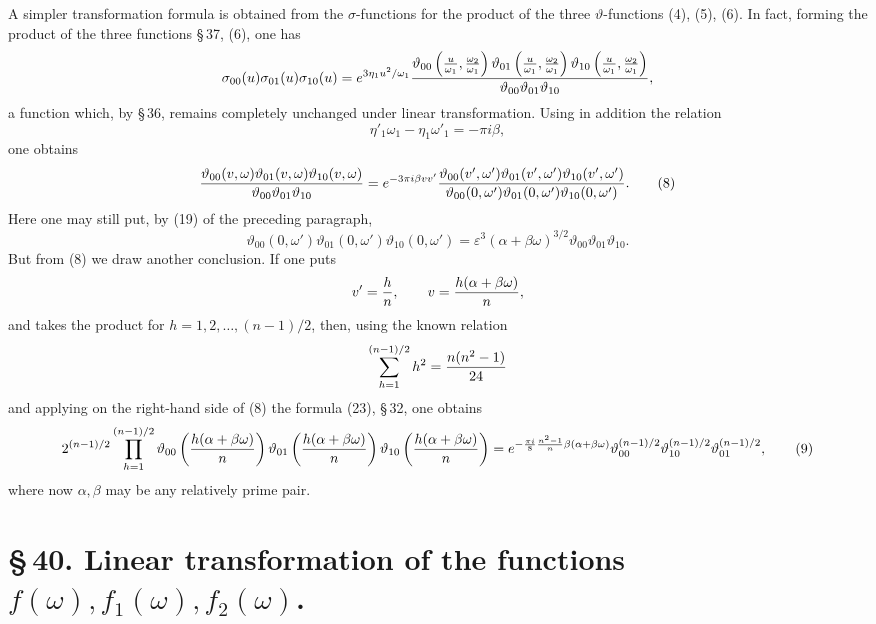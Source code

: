 \documentclass[11pt]{article}
\providecommand{\tht}{\vartheta}
\begin{document}
A simpler transformation formula is obtained from the $\sigma$-functions for the product of the three $\vartheta$-functions (4), (5), (6). In fact, forming the product of the three functions \S\,37, (6), one has
\[
{\sigma_{00}(u)\sigma_{01}(u)\sigma_{10}(u)}
=
 e^{3\eta_1u^2/\omega_1}
{\tht_{00}\left({u\over\omega_1},{\omega_2\over\omega_1}\right)
\tht_{01}\left({u\over\omega_1},{\omega_2\over\omega_1}\right)
\tht_{10}\left({u\over\omega_1},{\omega_2\over\omega_1}\right)
\over\tht_{00}\tht_{01}\tht_{10}},
\]
a function which, by \S\,36, remains completely unchanged under linear transformation. Using in addition the relation
\[
\eta'_1\omega_1-\eta_1\omega'_1=-\pi i\beta,
\]
one obtains
\begin{equation}
{\tht_{00}(v,
\omega)\tht_{01}(v,
\omega)\tht_{10}(v,
\omega)\over\tht_{00}\tht_{01}\tht_{10}}
=e^{-3\pi i\beta vv'}
{\tht_{00}(v',\omega')\tht_{01}(v',\omega')\tht_{10}(v',\omega')
\over\tht_{00}(0,
\omega')\tht_{01}(0,
\omega')\tht_{10}(0,
\omega')}. 
\tag{8}
\end{equation}
Here one may still put, by (19) of the preceding paragraph,
\[
\tht_{00}(0,
\omega')\tht_{01}(0,
\omega')\tht_{10}(0,
\omega')=
\varepsilon^3(\alpha+
\beta\omega)^{3/2}\tht_{00}\tht_{01}\tht_{10}.
\]
But from (8) we draw another conclusion. If one puts
\[
v'={h\over n},
\qquad
v={h(\alpha+
\beta\omega)
\over n},
\]
and takes the product for $h=1,2,\ldots,(n-1)/2$, then, using the known relation
\[
\sum_{h=1}^{(n-1)/2}h^2={n(n^2-1)\over24}
\]
and applying on the right-hand side of (8) the formula (23), \S\,32, one obtains
\begin{equation}
2^{(n-1)/2}
\prod_{h=1}^{(n-1)/2}
\tht_{00}\left({h(\alpha+
\beta\omega)\over n}\right)
\tht_{01}\left({h(\alpha+
\beta\omega)\over n}\right)
\tht_{10}\left({h(\alpha+
\beta\omega)\over n}\right)
=e^{-\frac{\pi i}{8}{n^2-1\over n}\beta(\alpha+
\beta\omega)}
\tht_{00}^{(n-1)/2}\tht_{10}^{(n-1)/2}\tht_{01}^{(n-1)/2},
\tag{9}
\end{equation}
where now $\alpha,\beta$ may be any relatively prime pair.

\section*{\S\,40. Linear transformation of the functions $f(\omega), f_1(\omega), f_2(\omega)$.}
\end{document}
